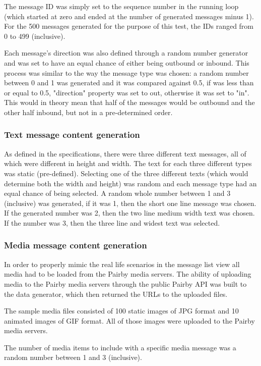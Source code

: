 \documentclass[a4paper,12pt]{article}
\begin{document}
The message ID was simply set to the sequence number in the running loop (which started at zero and ended at the number of generated messages minus 1). For the 500 messages generated for the purpose of this test, the IDs ranged from 0 to 499 (inclusive).

Each message's direction was also defined through a random number generator and was set to have an equal chance of either being outbound or inbound. This process was similar to the way the message type was chosen: a random number between 0 and 1 was generated and it was compared against 0.5, if was less than or equal to 0.5, "direction" property was set to out, otherwise it was set to "in". This would in theory mean that half of the messages would be outbound and the other half inbound, but not in a pre-determined order.

\subsubsection{Text message content generation}
As defined in the specifications, there were three different text messages, all of which were different in height and width. The text for each three different types was static (pre-defined). Selecting one of the three different texts (which would determine both the width and height) was random and each message type had an equal chance of being selected. A random whole number between 1 and 3 (inclusive) was generated, if it was 1, then the short one line message was chosen. If the generated number was 2, then the two line medium width text was chosen. If the number was 3, then the three line and widest text was selected.

\subsubsection{Media message content generation}
In order to properly mimic the real life scenarios in the message list view all media had to be loaded from the Pairby media servers. The ability of uploading media to the Pairby media servers through the public Pairby API was built to the data generator, which then returned the URLs to the uploaded files.

The sample media files consisted of 100 static images of JPG format and 10 animated images of GIF format. All of those images were uploaded to the Pairby media servers.

The number of media items to include with a specific media message was a random number between 1 and 3 (inclusive).
\end{document}
